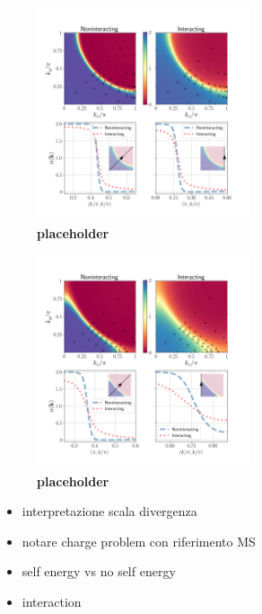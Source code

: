 \begin{figure}
\hspace*{-1.5cm}
\includegraphics[width=0.56\textwidth]{images/occupations_0975.png}
\caption{\textbf{placeholder}} 
\label{fig:occupation}
\end{figure}

\begin{figure}
\hspace*{-1.5cm}
\includegraphics[width=0.56\textwidth]{images/occupations_0600.png}
\caption{\textbf{placeholder}} 
\label{fig:occupation}
\end{figure}





\begin{itemize}
\item interpretazione scala divergenza
\item notare charge problem con riferimento MS 
\item self energy vs no self energy
\item interaction  
\end{itemize}   


